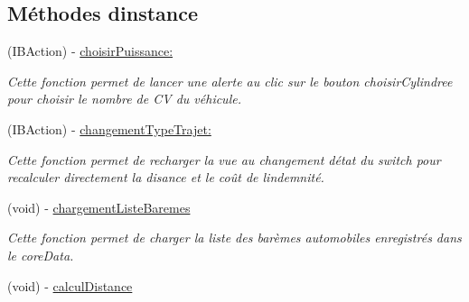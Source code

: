 \subsection*{Méthodes d\textquotesingle{}instance}
\begin{DoxyCompactItemize}
\item 
\hypertarget{interface_indemnites_table_view_controller_a5062cc3a031c84c40a9f16a173572557}{}(I\+B\+Action) -\/ \hyperlink{interface_indemnites_table_view_controller_a5062cc3a031c84c40a9f16a173572557}{choisir\+Puissance\+:}\label{interface_indemnites_table_view_controller_a5062cc3a031c84c40a9f16a173572557}

\begin{DoxyCompactList}\small\item\em Cette fonction permet de lancer une alerte au clic sur le bouton choisir\+Cylindree pour choisir le nombre de C\+V du véhicule. \end{DoxyCompactList}\item 
\hypertarget{interface_indemnites_table_view_controller_a2a2f76a0074ed3bb89673fb3acaa0d8a}{}(I\+B\+Action) -\/ \hyperlink{interface_indemnites_table_view_controller_a2a2f76a0074ed3bb89673fb3acaa0d8a}{changement\+Type\+Trajet\+:}\label{interface_indemnites_table_view_controller_a2a2f76a0074ed3bb89673fb3acaa0d8a}

\begin{DoxyCompactList}\small\item\em Cette fonction permet de recharger la vue au changement d\textquotesingle{}état du switch pour recalculer directement la disance et le coût de l\textquotesingle{}indemnité. \end{DoxyCompactList}\item 
\hypertarget{interface_indemnites_table_view_controller_a1b34033f12d19261c91e2f557ccc58fa}{}(void) -\/ \hyperlink{interface_indemnites_table_view_controller_a1b34033f12d19261c91e2f557ccc58fa}{chargement\+Liste\+Baremes}\label{interface_indemnites_table_view_controller_a1b34033f12d19261c91e2f557ccc58fa}

\begin{DoxyCompactList}\small\item\em Cette fonction permet de charger la liste des barèmes automobiles enregistrés dans le core\+Data. \end{DoxyCompactList}\item 
\hypertarget{interface_indemnites_table_view_controller_a7c86d1ddfb0541a430bc0e0043dde81f}{}(void) -\/ \hyperlink{interface_indemnites_table_view_controller_a7c86d1ddfb0541a430bc0e0043dde81f}{calcul\+Distance}\label{interface_indemnites_table_view_controller_a7c86d1ddfb0541a430bc0e0043dde81f}


\end{DoxyCompactItemize}
